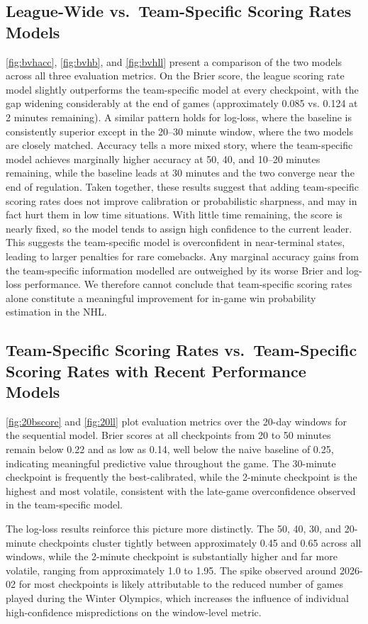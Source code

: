 \documentclass{article}
\begin{document}
\subsection{League-Wide vs.\ Team-Specific Scoring Rates Models}
\cref{fig:bvhacc}, \cref{fig:bvhb}, and \cref{fig:bvhll} present a comparison of the two models across all three evaluation metrics. On the Brier score, the league scoring rate model slightly outperforms the team-specific model at every checkpoint, with the gap widening considerably at the end of games (approximately 0.085 vs. 0.124 at 2 minutes remaining). A similar pattern holds for log-loss, where the baseline is consistently superior except in the 20–30 minute window, where the two models are closely matched. Accuracy tells a more mixed story, where the team-specific model achieves marginally higher accuracy at 50, 40, and 10–20 minutes remaining, while the baseline leads at 30 minutes and the two converge near the end of regulation. Taken together, these results suggest that adding team-specific scoring rates does not improve calibration or probabilistic sharpness, and may in fact hurt them in low time situations. With little time remaining, the score is nearly fixed, so the model tends to assign high confidence to the current leader. This suggests the team-specific model is overconfident in near-terminal states, leading to larger penalties for rare comebacks. Any marginal accuracy gains from the team-specific information modelled are outweighed by its worse Brier and log-loss performance. We therefore cannot conclude that team-specific scoring rates alone constitute a meaningful improvement for in-game win probability estimation in the NHL.

\subsection{Team-Specific Scoring Rates vs.\ Team-Specific Scoring Rates with Recent
Performance Models}

\cref{fig:20bscore} and \cref{fig:20ll} plot evaluation metrics over the 20-day windows for the sequential model. Brier scores at all checkpoints from 20 to 50 minutes remain below 0.22 and as low as 0.14, well below the naive baseline of 0.25, indicating meaningful predictive value throughout the game. The 30-minute checkpoint is frequently the best-calibrated, while the 2-minute checkpoint is the highest and most volatile, consistent with the late-game overconfidence observed in the team-specific model.

The log-loss results reinforce this picture more distinctly. The 50, 40, 30, and 20-minute checkpoints cluster tightly between approximately 0.45 and 0.65 across all windows, while the 2-minute checkpoint is substantially higher and far more volatile, ranging from approximately 1.0 to 1.95. The spike observed around 2026-02 for most checkpoints is likely attributable to the reduced number of games played during the Winter Olympics, which increases the influence of individual high-confidence mispredictions on the window-level metric.
\end{document}
